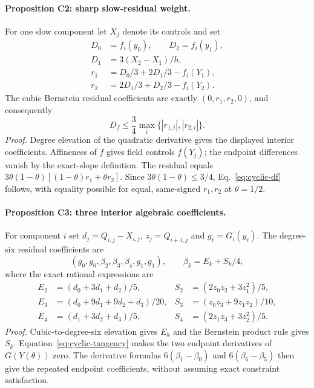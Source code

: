 \paragraph{Proposition C2: sharp slow-residual weight.}
For one slow component let $X_j$ denote its controls and set
\begin{align}
 D_0&=f_i(y_0),\qquad D_2=f_i(y_1),\\
 D_1&=3(X_2-X_1)/h,\\
 r_1&=D_0/3+2D_1/3-f_i(Y_1),\\
 r_2&=2D_1/3+D_2/3-f_i(Y_2).
\end{align}
The cubic Bernstein residual coefficients are exactly $(0,r_1,r_2,0)$,
and consequently
\begin{equation}
 D_f\le\frac34\max_i\{|r_{1,i}|,|r_{2,i}|\}.               \label{eq:cyclic-df}
\end{equation}
\emph{Proof.}
Degree elevation of the quadratic derivative gives the displayed interior
coefficients. Affineness of $f$ gives field controls $f(Y_j)$; the endpoint
differences vanish by the exact-slope definition. The residual equals
$3\theta(1-\theta)[(1-\theta)r_1+\theta r_2]$.
Since $3\theta(1-\theta)\le3/4$, Eq.~\eqref{eq:cyclic-df} follows, with
equality possible for equal, same-signed $r_1,r_2$ at $\theta=1/2$.

\paragraph{Proposition C3: three interior algebraic coefficients.}
For component $i$ set $d_j=Q_{i,j}-X_{i,j}$, $z_j=Q_{i+1,j}$ and
$g_\ell=G_i(y_\ell)$. The degree-six residual coefficients are
\begin{equation}
 (g_0,g_0,\beta_2,\beta_3,\beta_4,g_1,g_1),\qquad
 \beta_k=E_k+S_k/4,                                      \label{eq:cyclic-gcoeff}
\end{equation}
where the exact rational expressions are
\begin{align}
 E_2&=(d_0+3d_1+d_2)/5,&S_2&=(2z_0z_2+3z_1^2)/5,\\
 E_3&=(d_0+9d_1+9d_2+d_3)/20,&
 S_3&=(z_0z_3+9z_1z_2)/10,\\
 E_4&=(d_1+3d_2+d_3)/5,&S_4&=(2z_1z_3+3z_2^2)/5.
\end{align}
\emph{Proof.}
Cubic-to-degree-six elevation gives $E_k$ and the Bernstein product rule
gives $S_k$. Equation~\eqref{eq:cyclic-tangency} makes the two endpoint
derivatives of $G(Y(\theta))$ zero. The derivative formulas
$6(\beta_1-\beta_0)$ and $6(\beta_6-\beta_5)$ then give the repeated
endpoint coefficients, without assuming exact constraint satisfaction.


